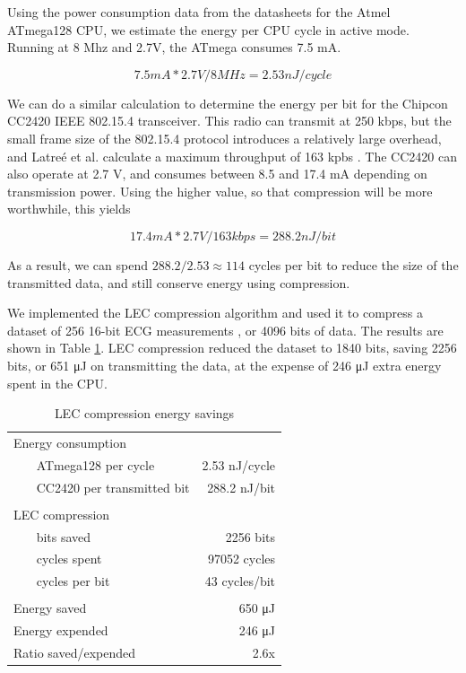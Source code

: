 Using the power consumption data from the datasheets for the Atmel ATmega128 \cite{Atmel:ATmega128Datasheet} CPU, we estimate the energy per CPU cycle in active mode. Running at 8 Mhz and 2.7V, the ATmega consumes 7.5 mA.

\begin{equation}
    7.5mA * 2.7V / 8MHz = 2.53nJ / cycle  
\end{equation}

We can do a similar calculation to determine the energy per bit for the Chipcon CC2420 IEEE 802.15.4 transceiver. This radio can transmit at 250 kbps, but the small frame size of the 802.15.4 protocol introduces a relatively large overhead, and Latre\'e et al. calculate a maximum throughput of 163 kpbs \cite{Latre:2006wr}. The CC2420 can also operate at 2.7 V, and consumes between 8.5 and 17.4 mA depending on transmission power. Using the higher value, so that compression will be more worthwhile, this yields

\begin{equation}
  17.4 mA * 2.7 V / 163 kbps = 288.2 nJ / bit
\end{equation}

As a result, we can spend $288.2/2.53 \approx 114$ cycles per bit to reduce the size of the transmitted data, and still conserve energy using compression.

We implemented the LEC compression algorithm and used it to compress a dataset of 256 16-bit ECG measurements \cite{physionet-ecg-data}, or 4096 bits of data. The results are shown in Table \ref{tbl-lec-energy}. LEC compression reduced the dataset to 1840 bits, saving 2256 bits, or 651 μJ on transmitting the data, at the expense of 246 μJ extra energy spent in the CPU.

\begin{table}
\caption{LEC compression energy savings}
\label{tbl-lec-energy}
    \begin{tabular}{lr} %
    \toprule
    Energy consumption \\
    ~~~ ATmega128 per cycle            & 2.53 nJ/cycle  \\
    ~~~ CC2420 per transmitted bit     & 288.2 nJ/bit  \\
    \\
    LEC compression \\
    ~~~ bits saved                     & 2256 bits \\
    ~~~ cycles spent                   & 97052 cycles\\
    ~~~ cycles per bit                 & 43 cycles/bit \\
    \\
    Energy saved                       & 650 μJ \\
    Energy expended                    & 246 μJ \\
    Ratio saved/expended               & 2.6x \\
    \bottomrule
    \end{tabular}
\end{table}

